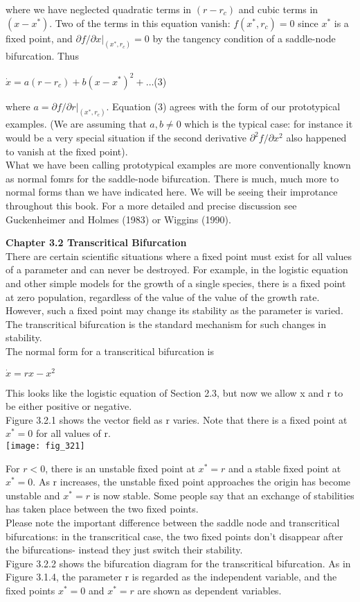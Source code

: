 \documentclass{article}
\newcommand\tab[1][1cm]{\hspace*{#1}}
\begin{document}
where we have neglected quadratic terms in $(r-r_{c})$ and cubic terms in $(x-x^{*})$. Two of the terms in this equation vanish: $f(x^{*}, r_{c}) =0$ since $x^{*}$ is a fixed point, and $\partial{f}/\partial{x}|_{(x^{*},r_{c})}=0$ by the tangency condition of a saddle-node bifurcation. Thus
\begin{center}
$\dot{x}=a{(r-r_{c})}+b(x-x^{*})^{2} + \hdots $\tab (3)
\end{center}
where $a = \partial{f}/\partial{r}|_{(x^{*},r_{c})}$. Equation (3) agrees with the form of our prototypical examples. (We are assuming that $a,b \neq 0$ which is the typical case: for instance it would be a very special situation if the second derivative $\partial^{2}{f}/\partial{x}^{2}$ also happened to vanish at the fixed point). \\
What we have been calling prototypical examples are more conventionally known as normal fomrs for the saddle-node bifurcation. There is much, much more to normal forms than we have indicated here. We will be seeing their improtance throughout this book. For a more detailed and precise discussion see Guckenheimer and Holmes (1983) or Wiggins (1990).

\textbf {Chapter 3.2 Transcritical Bifurcation} \\
There are certain scientific situations where a fixed point must exist for all values of a parameter and can never be destroyed. For example, in the logistic equation and other simple models for the growth of a single species, there is a fixed point at zero population, regardless of the value of the value of the growth rate. However, such a fixed point may change its stability as the parameter is varied. The transcritical bifurcation is the standard mechanism for such changes in stability. \\
\tab The normal form for a transcritical bifurcation is
\begin{center}
$\dot{x}=rx - x^{2}$
\end{center}
This looks like the logistic equation of Section 2.3, but now we allow x and r to be either positive or negative. \\
\tab Figure 3.2.1 shows the vector field as r varies. Note that there is a fixed point at $x^{*}=0$ for all values of r. \\
\texttt{[image: fig\_321]}

For $r < 0$, there is an unstable fixed point at $x^{*} = r$ and a stable fixed point at $x^{*}=0$. As r increases, the unstable fixed point approaches the origin has become unstable and $x^{*}=r$ is now stable. Some people say that an exchange of stabilities has taken place between the two fixed points. \\
\tab Please note the important difference between the saddle node and transcritical bifurcations: in the transcritical case, the two fixed points don't disappear after the bifurcations- instead they just switch their stability. \\
\tab Figure 3.2.2 shows the bifurcation diagram for the transcritical bifurcation. As in Figure 3.1.4, the parameter r is regarded as the independent variable, and the fixed points $x^{*}=0$ and $x^{*}=r$ are shown as dependent variables.
\end{document}
